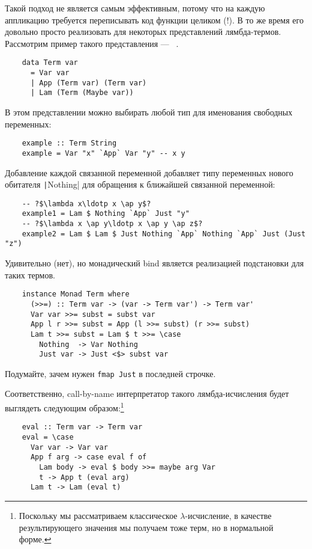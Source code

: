 Такой подход не является самым эффективным, потому что на каждую аппликацию требуется переписывать код функции целиком (!).
В то же время его довольно просто реализовать для некоторых представлений лямбда-термов.
Рассмотрим пример такого представления --- ~\cite{chargueraud2012locally}.

\begin{verbatim}
    data Term var
      = Var var
      | App (Term var) (Term var)
      | Lam (Term (Maybe var))
\end{verbatim}

В этом представлении можно выбирать любой тип для именования свободных переменных:
\begin{verbatim}
    example :: Term String
    example = Var "x" `App` Var "y" -- x y
\end{verbatim}
Добавление каждой связанной переменной добавляет типу переменных нового обитателя \texttt|Nothing| для обращения к ближайшей связанной переменной:
\begin{verbatim}
    -- ?$\lambda x\ldotp x \ap y$?
    example1 = Lam $ Nothing `App` Just "y"
    -- ?$\lambda x \ap y\ldotp x \ap y \ap z$?
    example2 = Lam $ Lam $ Just Nothing `App` Nothing `App` Just (Just "z")
\end{verbatim}

Удивительно (нет), но монадический bind является реализацией подстановки для таких термов.

\begin{verbatim}
    instance Monad Term where
      (>>=) :: Term var -> (var -> Term var') -> Term var'
      Var var >>= subst = subst var
      App l r >>= subst = App (l >>= subst) (r >>= subst)
      Lam t >>= subst = Lam $ t >>= \case
        Nothing  -> Var Nothing
        Just var -> Just <$> subst var
\end{verbatim}

\begin{task}
    Подумайте, зачем нужен \texttt{fmap Just} в последней строчке.
\end{task}

Соответственно, call-by-name интерпретатор такого лямбда-исчисления будет выглядеть следующим образом:\footnote{Поскольку мы рассматриваем классическое $\lambda$-исчисление, в качестве результирующего значения мы получаем тоже терм, но в нормальной форме.}

\begin{verbatim}
    eval :: Term var -> Term var
    eval = \case
      Var var -> Var var
      App f arg -> case eval f of
        Lam body -> eval $ body >>= maybe arg Var
        t -> App t (eval arg)
      Lam t -> Lam (eval t)
\end{verbatim}

